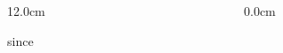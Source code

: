 \begin{frame}
\begin{columns}
\begin{column}{12.0cm}
\vspace{0.5cm}

since 

\vspace{4.5cm}

\end{column}
\begin{column}{0.0cm}
	
\end{column}
\end{columns}
\end{frame}

